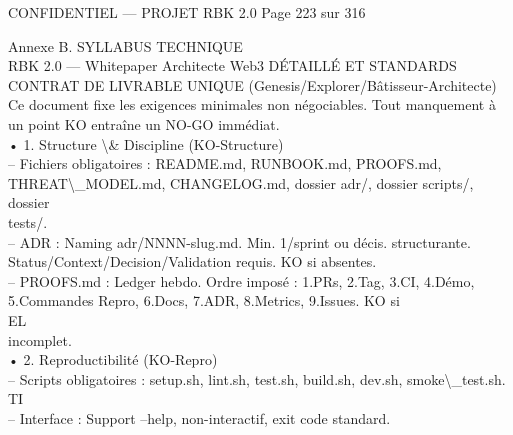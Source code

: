 \documentclass[12pt,landscape,a4paper]{article}
\newenvironment{confidential}
{\begin{tcolorbox}[
    colback=rbkred!5!white,
    colframe=rbkred!75!black,
    title=CONFIDENTIEL,
    fonttitle=\bfseries\color{white},
    coltitle=rbkred!75!black,
    breakable,
    enhanced,
    frame hidden,
    borderline west={2pt}{0pt}{rbkred!75!black}
]}
{\end{tcolorbox}}
\begin{document}
\vspace{0.5em}
\vspace{0.5em}
\vspace{0.5em}
\begin{confidential}CONFIDENTIEL — PROJET RBK 2.0                      Page 223 sur 316\end{confidential}
Annexe B. SYLLABUS TECHNIQUE\\
RBK 2.0 — Whitepaper Architecte Web3                                                                                    DÉTAILLÉ ET STANDARDS\\
\vspace{0.5em}
\vspace{0.5em}
\vspace{0.5em}
\vspace{0.5em}
CONTRAT DE LIVRABLE UNIQUE (Genesis/Explorer/Bâtisseur-Architecte)\\
Ce document fixe les exigences minimales non négociables. Tout manquement à un point KO entraîne un NO-GO immédiat.\\
• 1. Structure \textbackslash{}& Discipline (KO-Structure)\\
– Fichiers obligatoires : README.md, RUNBOOK.md, PROOFS.md, THREAT\textbackslash{}_MODEL.md, CHANGELOG.md, dossier adr/, dossier scripts/, dossier\\
tests/.\\
– ADR : Naming adr/NNNN-slug.md. Min. 1/sprint ou décis. structurante. Status/Context/Decision/Validation requis. KO si absentes.\\
– PROOFS.md : Ledger hebdo. Ordre imposé : 1.PRs, 2.Tag, 3.CI, 4.Démo, 5.Commandes Repro, 6.Docs, 7.ADR, 8.Metrics, 9.Issues. KO si\\
\vspace{0.5em}
\vspace{0.5em}
\vspace{0.5em}
\vspace{0.5em}
EL\\
incomplet.\\
• 2. Reproductibilité (KO-Repro)\\
– Scripts obligatoires : setup.sh, lint.sh, test.sh, build.sh, dev.sh, smoke\textbackslash{}_test.sh.\\
\vspace{0.5em}
\vspace{0.5em}
\vspace{0.5em}
\vspace{0.5em}
TI\\
– Interface : Support --help, non-interactif, exit code standard.\\
\end{document}
